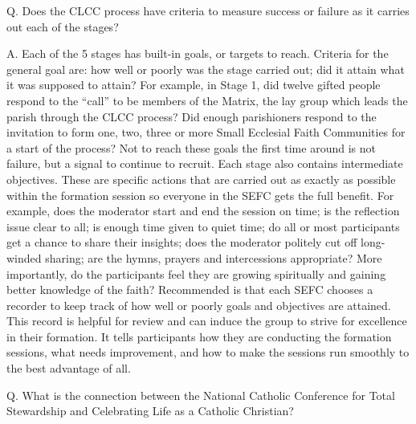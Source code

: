 \documentclass[oneside]{book}
\begin{document}
Q. Does the CLCC process have criteria to measure success or failure as it
carries out each of the stages?

A. Each of the 5 stages has built-in goals, or targets to reach. Criteria for
the general goal are: how well or poorly was the stage carried out; did it
attain what it was supposed to attain? For example, in Stage 1, did twelve
gifted people respond to the ``call'' to be members of the Matrix, the lay group
which leads the parish through the CLCC process? Did enough parishioners respond
to the invitation to form one, two, three or more Small Ecclesial Faith
Communities for a start of the process? Not to reach these goals the first time
around is not failure, but a signal to continue to recruit.
Each stage also contains intermediate objectives. These are specific actions
that are carried out as exactly as possible within the formation session so
everyone in the SEFC gets the full benefit. For example, does the moderator
start and end the session on time; is the reflection issue clear to all; is
enough time given to quiet time; do all or most participants get a chance to
share their insights; does the moderator politely cut off long-winded sharing;
are the hymns, prayers and intercessions appropriate? More importantly, do the
participants feel they are growing spiritually and gaining better knowledge of
the faith?
Recommended is that each SEFC chooses a recorder to keep track of how well or
poorly goals and objectives are attained. This record is helpful for review and
can induce the group to strive for excellence in their formation. It tells
participants how they are conducting the formation sessions, what needs
improvement, and how to make the sessions run smoothly to the best advantage of
all.

Q. What is the connection between the National Catholic Conference for Total
Stewardship and Celebrating Life as a Catholic Christian?
\end{document}
